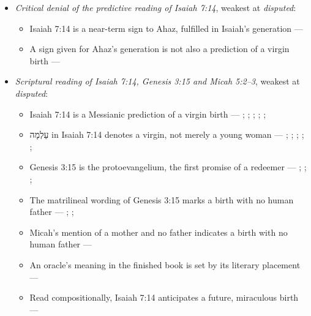 \documentclass[11pt]{article}
\begin{document}
\begin{itemize}
\item \emph{Critical denial of the predictive reading of Isaiah 7:14}, weakest at \emph{disputed}:
\begin{itemize}
\item Isaiah 7:14 is a near-term sign to Ahaz, fulfilled in Isaiah’s generation --- \cite{brown-birth-messiah-1993}
\item A sign given for Ahaz’s generation is not also a prediction of a virgin birth --- \cite{brown-birth-messiah-1993}
\end{itemize}
\item \emph{Scriptural reading of Isaiah 7:14, Genesis 3:15 and Micah 5:2–3}, weakest at \emph{disputed}:
\begin{itemize}
\item Isaiah 7:14 is a Messianic prediction of a virgin birth --- \cite[ad loc. Isa 7:14]{motyer-isaiah-1993}; \cite[123]{motyer-context-content-1970}; \cite[12--14]{compton-immanuel-prophecy-2007}; \cite[66]{justin-dialogue-with-trypho-160}; \cite[III.21.6]{irenaeus-against-heresies-180}; \cite[I.35]{origen-against-celsus-248}
\item עַלְמָה in Isaiah 7:14 denotes a virgin, not merely a young woman --- \cite[ad loc. Isa 7:14]{motyer-isaiah-1993}; \cite[app. Isa 7:14]{bhs-1997}; \cite[1653--1654]{berry-virgin-birth-2003}; \cite[125]{motyer-context-content-1970}; \cite[7--8]{compton-immanuel-prophecy-2007}; \cite[I.32]{jerome-against-jovinianus-393}
\item Genesis 3:15 is the protoevangelium, the first promise of a redeemer --- \cite[167]{leupold-exposition-genesis-1942}; \cite[102]{keil-delitzsch-pentateuch-1866}; \cite{miravalle-meet-your-mother-2014}; \cite[318]{lewis-womans-seed-1991}
\item The matrilineal wording of Genesis 3:15 marks a birth with no human father --- \cite[298--299]{luther-on-the-creation-1904}; \cite{miravalle-meet-your-mother-2014}; \cite[ad loc. Gen 3:15]{henry-commentary-whole-bible}
\item Micah’s mention of a mother and no father indicates a birth with no human father --- \cite{miravalle-introduction-mary-2020}
\item An oracle’s meaning in the finished book is set by its literary placement --- \cite[476--479]{postell-isaiah-messianic-2025}
\item Read compositionally, Isaiah 7:14 anticipates a future, miraculous birth --- \cite[490--493]{postell-isaiah-messianic-2025}

\end{itemize}
\end{itemize}
\end{document}
